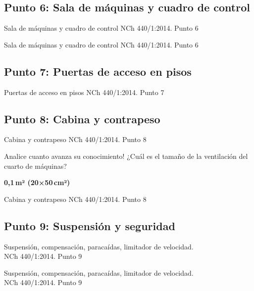 \subsection{Punto 6: Sala de máquinas y cuadro de control}
\begin{frame}{Sala de máquinas y cuadro de control NCh 440/1:2014. Punto 6}
\end{frame}

\begin{frame}{Sala de máquinas y cuadro de control NCh 440/1:2014. Punto 6}
\end{frame}

\subsection{Punto 7: Puertas de acceso en pisos}
\begin{frame}{Puertas de acceso en pisos NCh 440/1:2014. Punto 7}
\end{frame}

\subsection{Punto 8: Cabina y contrapeso}
\begin{frame}{Cabina y contrapeso NCh 440/1:2014. Punto 8}
\end{frame}

\begin{frame}{Analice cuanto avanza su conocimiento!}
	¿Cuál es el tamaño de la ventilación del cuarto de máquinas?
	
	\bigskip
	\textbf{0,1\,m² \quad (20×50\,cm²)}
\end{frame}

\begin{frame}{Cabina y contrapeso NCh 440/1:2014. Punto 8}
\end{frame}

\subsection{Punto 9: Suspensión y seguridad}
\begin{frame}{Suspensión, compensación, paracaídas, limitador de velocidad.\\NCh 440/1:2014. Punto 9}
\end{frame}

\begin{frame}{Suspensión, compensación, paracaídas, limitador de velocidad.\\NCh 440/1:2014. Punto 9}
\end{frame}

